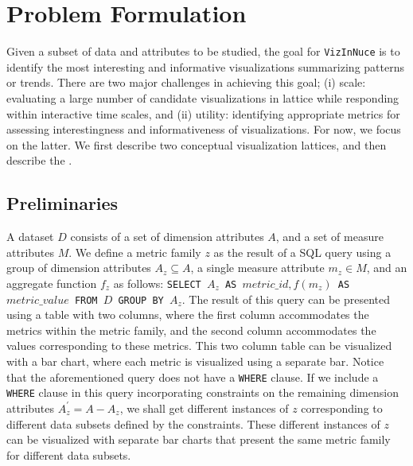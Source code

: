 \section{Problem Formulation} 
 
Given a subset of data and attributes to be studied, the goal for {\tt VizInNuce} is to  identify the most interesting and informative visualizations summarizing patterns or trends. There are two major challenges in achieving this goal; (i) scale: evaluating a large number of candidate visualizations in lattice while responding within interactive time scales, and (ii) utility: identifying appropriate metrics for assessing interestingness and informativeness of visualizations. For now, we focus on the latter. We first describe two conceptual visualization lattices, and then describe the .

 
 
 
\subsection{Preliminaries} 
A dataset $D$ consists of a set of dimension attributes $A$, and a set of measure attributes $M$. We define a metric family $z$ as the result of a SQL query using a group of dimension attributes $A_z \subseteq A$, a single measure attribute $m_z \in M$, and an aggregate function $f_z$ as follows: {\tt SELECT $A_z$ AS $metric\_id, f(m_z)$ AS $metric\_value$ FROM $D$ GROUP BY $A_z$}. The result of this query can be presented using a table with two columns, where the first column accommodates the metrics within the metric family, and the second column accommodates the values corresponding to these metrics. This two column table can be visualized with a bar chart, where each metric is visualized using a separate bar. 
\newline
\newline
Notice that the aforementioned query does not have a {\tt WHERE} clause. If we include a {\tt WHERE} clause in this query incorporating constraints on the remaining dimension attributes $A_z^\prime = A - A_z$, we shall get different instances of $z$ corresponding to different data subsets defined by the constraints. These different instances of $z$ can be visualized with separate bar charts that present the same metric family for different data subsets. 

